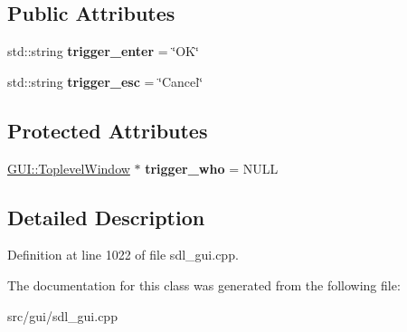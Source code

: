 \subsection*{Public Attributes}
\begin{DoxyCompactItemize}
\item 
\hypertarget{classInputWithEnterKey_ab1f039aa213cc2c6d189a712c456958e}{std\-::string {\bfseries trigger\-\_\-enter} = \char`\"{}O\-K\char`\"{}}\label{classInputWithEnterKey_ab1f039aa213cc2c6d189a712c456958e}

\item 
\hypertarget{classInputWithEnterKey_ad0f1644bc2918baa46e8c63d3193b3fe}{std\-::string {\bfseries trigger\-\_\-esc} = \char`\"{}Cancel\char`\"{}}\label{classInputWithEnterKey_ad0f1644bc2918baa46e8c63d3193b3fe}

\end{DoxyCompactItemize}
\subsection*{Protected Attributes}
\begin{DoxyCompactItemize}
\item 
\hypertarget{classInputWithEnterKey_a28afbaf196623f3534601338135fb6ea}{\hyperlink{classGUI_1_1ToplevelWindow}{G\-U\-I\-::\-Toplevel\-Window} $\ast$ {\bfseries trigger\-\_\-who} = N\-U\-L\-L}\label{classInputWithEnterKey_a28afbaf196623f3534601338135fb6ea}

\end{DoxyCompactItemize}


\subsection{Detailed Description}


Definition at line 1022 of file sdl\-\_\-gui.\-cpp.



The documentation for this class was generated from the following file\-:\begin{DoxyCompactItemize}
\item 
src/gui/sdl\-\_\-gui.\-cpp\end{DoxyCompactItemize}
